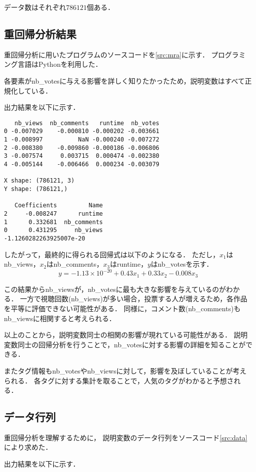 \documentclass[uplatex]{jsarticle}
\begin{document}
データ数はそれぞれ$786121$個ある．

\subsection{重回帰分析結果}

重回帰分析に用いたプログラムのソースコードを\ref{src:mra}に示す．
プログラミング言語はPythonを利用した．

各要素がnb\_votesに与える影響を詳しく知りたかったため，説明変数はすべて正規化している．



出力結果を以下に示す．
\begin{screen}
\begin{verbatim}
   nb_views  nb_comments   runtime  nb_votes
0 -0.007029    -0.000810 -0.000202 -0.003661
1 -0.008997          NaN -0.000240 -0.007272
2 -0.008380    -0.009860 -0.000186 -0.006806
3 -0.007574     0.003715  0.000474 -0.002380
4 -0.005144    -0.006466  0.000234 -0.003079

X shape: (786121, 3)
Y shape: (786121,)

   Coefficients         Name
2     -0.008247      runtime
1      0.332681  nb_comments
0      0.431295     nb_views
-1.1260282263925007e-20
\end{verbatim}
\end{screen}

したがって，最終的に得られる回帰式は以下のようになる．
ただし，$x_1$はnb\_views，$x_2$はnb\_comments，$x_3$はruntime，$y$はnb\_votesを示す．
\begin{equation}
    y = -1.13\times 10^{-20} + 0.43 x_1 + 0.33 x_2 - 0.008 x_3
\end{equation}

この結果からnb\_viewsが，nb\_votesに最も大きな影響を与えているのがわかる．
一方で視聴回数(nb\_views)が多い場合，投票する人が増えるため，各作品を平等に評価できない可能性がある．
同様に，コメント数(nb\_comments)もnb\_viewsに相関すると考えられる．

以上のことから，説明変数同士の相関の影響が現れている可能性がある．
説明変数同士の回帰分析を行うことで，nb\_votesに対する影響の詳細を知ることができる．

またタグ情報もnb\_votesやnb\_viewsに対して，影響を及ぼしていることが考えられる．
各タグに対する集計を取ることで，人気のタグがわかると予想される．


\subsection{データ行列}

重回帰分析を理解するために，
説明変数のデータ行列をソースコード\ref{src:data}により求めた．



出力結果を以下に示す．
\begin{screen}
\begin{verbatim}

\end{verbatim}
\end{screen}
\end{document}
